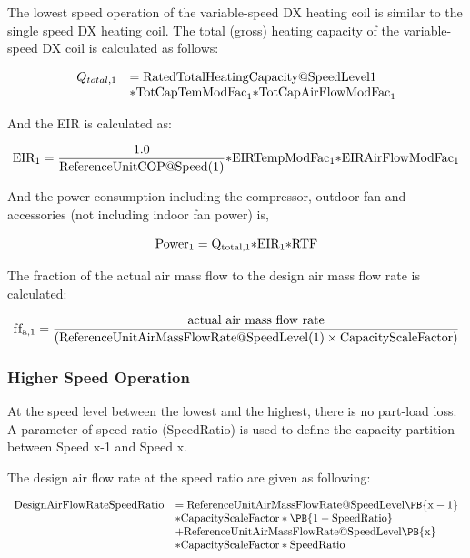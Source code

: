 The lowest speed operation of the variable-speed DX heating coil is similar to the single speed DX heating coil. The total (gross) heating capacity of the variable-speed DX coil is calculated as follows:

\begin{equation}
  \begin{array}{rl}
    Q_{total,1} &= \rm{RatedTotalHeatingCapacity @ SpeedLevel 1} \\
                &* \rm{TotCapTemModFac}_1 \rm{* TotCapAirFlowModFac}_1
  \end{array}
\end{equation}

And the EIR is calculated as:

\begin{equation}
{\rm{EI}}{{\rm{R}}_1} = \frac{{1.0}}{{{\rm{ReferenceUnitCOP}}@{\rm{Speed}}(1)}}{\rm{*EIRTempModFa}}{{\rm{c}}_1}{\rm{*EIRAirFlowModFa}}{{\rm{c}}_1}
\end{equation}

And the power consumption including the compressor, outdoor fan and accessories (not including indoor fan power) is,

\begin{equation}
{\rm{Powe}}{{\rm{r}}_1} = {{\rm{Q}}_{{\rm{total}},1}}{\rm{*EI}}{{\rm{R}}_1}{\rm{*RTF}}
\end{equation}

The fraction of the actual air mass flow to the design air mass flow rate is calculated:

\begin{equation}
{\rm{f}}{{\rm{f}}_{{\rm{a}},1}} = \frac{{{\rm{actual~air~mass~flow~rate}}}}{{({\rm{ReferenceUnitAirMassFlowRate}}@{\rm{SpeedLevel}}(1) \times {\rm{CapacityScaleFactor}})}}{\rm{}}
\end{equation}

\subsubsection{Higher Speed Operation}\label{higher-speed-operation-1-001}

At the speed level between the lowest and the highest, there is no part-load loss. A parameter of speed ratio (SpeedRatio) is used to define the capacity partition between Speed x-1 and Speed x.

The design air flow rate at the speed ratio are given as following:

\begin{equation}
  \begin{array}{rl}
    \rm{DesignAirFlowRateSpeedRatio} &= \rm{ReferenceUnitAirMassFlowRate @ SpeedLevel} \PB{x-1} \\
                                     &* \rm{CapacityScaleFactor} * \PB{1 - SpeedRatio} \\
                                     &+ \rm{ReferenceUnitAirMassFlowRate @ SpeedLevel} \PB{x} \\
                                     &* \rm{CapacityScaleFactor*SpeedRatio}
  \end{array}
\end{equation}

